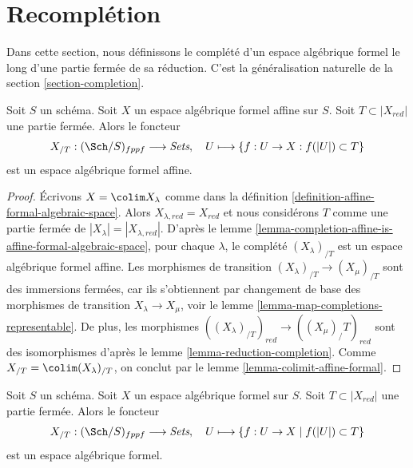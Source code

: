 \section{Recomplétion}
\label{section-recompletion}

\noindent
Dans cette section, nous définissons le complété d'un espace algébrique
formel le long d'une partie fermée de sa réduction. C'est la généralisation
naturelle de la section \ref{section-completion}.

\begin{lemma}
\label{lemma-completion-affine-formal-is-affine-formal}
Soit $S$ un schéma. Soit $X$ un espace algébrique formel affine sur $S$.
Soit $T \subset |X_{red}|$ une partie fermée. Alors le foncteur
$$
X_{/T} : (\Sch/S)_{fppf} \longrightarrow \textit{Sets},\quad
U \longmapsto \{f : U \to X : f(|U|) \subset T\}
$$
est un espace algébrique formel affine.
\end{lemma}

\begin{proof}
Écrivons $X = \colim X_\lambda$ comme dans la
définition \ref{definition-affine-formal-algebraic-space}.
Alors $X_{\lambda, red} = X_{red}$ et nous considérons
$T$ comme une partie fermée de $|X_\lambda| = |X_{\lambda, red}|$.
D'après le lemme \ref{lemma-completion-affine-is-affine-formal-algebraic-space},
pour chaque $\lambda$, le complété
$(X_\lambda)_{/T}$ est un espace algébrique formel affine.
Les morphismes de transition $(X_\lambda)_{/T} \to (X_\mu)_{/T}$ sont des
immersions fermées, car ils s'obtiennent par changement de base des morphismes de transition
$X_\lambda \to X_\mu$, voir le lemme \ref{lemma-map-completions-representable}.
De plus, les morphismes $((X_\lambda)_{/T})_{red} \to ((X_\mu)_/T)_{red}$
sont des isomorphismes d'après le lemme \ref{lemma-reduction-completion}.
Comme $X_{/T} = \colim (X_\lambda)_{/T}$, on conclut
par le lemme \ref{lemma-colimit-affine-formal}.
\end{proof}

\begin{lemma}
\label{lemma-completion-fas-is-fas}
Soit $S$ un schéma. Soit $X$ un espace algébrique formel sur $S$.
Soit $T \subset |X_{red}|$ une partie fermée. Alors le foncteur
$$
X_{/T} : (\Sch/S)_{fppf} \longrightarrow \textit{Sets},\quad
U \longmapsto \{f : U \to X \mid f(|U|) \subset T\}
$$
est un espace algébrique formel.
\end{lemma}

